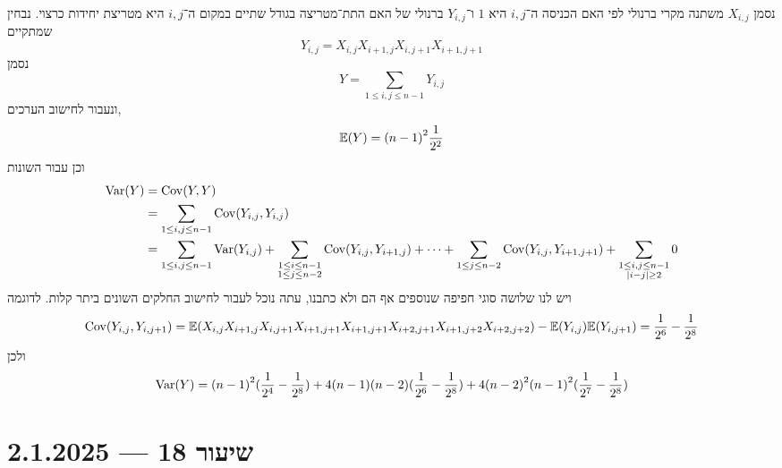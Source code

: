 \begin{solution}
	נסמן $X_{i, j}$ משתנה מקרי ברנולי לפי האם הכניסה ה־$i, j$ היא $1$ ו־$Y_{i, j}$ ברנולי של האם התת־מטריצה בגודל שתיים במקום ה־$i, j$ היא מטריצת יחידות כרצוי.
	נבחין שמתקיים
	\[
		Y_{i, j} = X_{i, j} X_{i + 1, j} X_{i, j + 1} X_{i + 1, j + 1}
	\]
	נסמן
	\[
		Y = \sum_{1 \le i, j \le n - 1} Y_{i, j}
	\]
	ונעבור לחישוב הערכים,
	\[
		\mathbb{E}(Y)
		= {(n - 1)}^2 \frac{1}{2^2}
	\]
	וכן עבור השונות
	\begin{align*}
		\operatorname{Var}(Y)
		& = \operatorname{Cov}(Y, Y) \\
		& = \sum_{1 \le i, j \le n - 1} \operatorname{Cov}(Y_{i, j}, Y_{i, j}) \\
		& = \sum_{1 \le i, j \le n - 1} \operatorname{Var}(Y_{i, j})
		+ \sum_{\substack{1 \le i \le n - 1 \\ 1 \le j \le n - 2}} \operatorname{Cov}(Y_{i, j}, Y_{i + 1, j})
		+ \cdots
		+ \sum_{1 \le j \le n - 2} \operatorname{Cov}(Y_{i, j}, Y_{i + 1, j + 1})
		+ \sum_{\substack{1 \le i, j \le n - 1 \\ |i - j| \ge 2}} 0
	\end{align*}
	ויש לנו שלושה סוגי חפיפה שנוספים אף הם ולא כתבנו, עתה נוכל לעבור לחישוב החלקים השונים ביתר קלות.
	לדוגמה
	\[
		\operatorname{Cov}(Y_{i, j}, Y_{i, j + 1})
		= \mathbb{E}(X_{i, j} X_{i + 1, j} X_{i, j + 1} X_{i + 1, j + 1} X_{i + 1, j + 1} X_{i + 2, j + 1} X_{i + 1, j + 2} X_{i + 2, j + 2}) - \mathbb{E}(Y_{i, j}) \mathbb{E}(Y_{i, j + 1})
		= \frac{1}{2^6} - \frac{1}{2^8}
	\]
	ולכן
	\[
		\operatorname{Var}(Y)
		= {(n - 1)}^2 (\frac{1}{2^4} - \frac{1}{2^8})
		+ 4(n - 1)(n - 2) (\frac{1}{2^6} - \frac{1}{2^8})
		+ 4 {(n - 2)}^2 {(n - 1)}^2 (\frac{1}{2^7} - \frac{1}{2^8})
	\]
\end{solution}

\section{שיעור 18 --- 2.1.2025}

